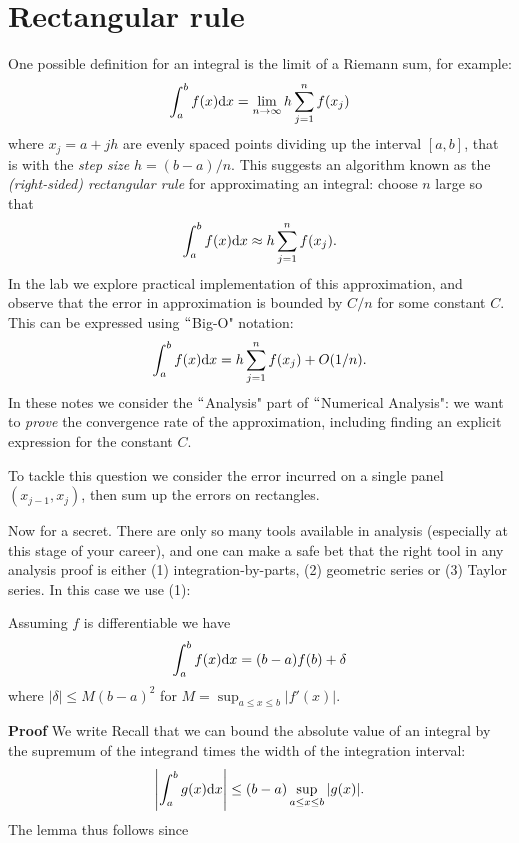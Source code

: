 
\section{Rectangular rule}
One possible definition for an integral is the limit of a Riemann sum, for example:
\[
  \ensuremath{\int}_a^b f(x) {\rm d}x = \lim_{n \ensuremath{\rightarrow} \ensuremath{\infty}} h \ensuremath{\sum}_{j=1}^n f(x_j)
\]
where $x_j = a+jh$ are evenly spaced points dividing up the interval $[a,b]$, that is  with the \emph{step size} $h = (b-a)/n$. This suggests an algorithm known as the \emph{(right-sided) rectangular rule} for approximating an integral: choose $n$ large so that
\[
  \ensuremath{\int}_a^b f(x) {\rm d}x \ensuremath{\approx} h \ensuremath{\sum}_{j=1}^n f(x_j).
\]
In the lab we explore practical implementation of this approximation, and observe that the error in approximation is bounded by $C/n$ for some constant $C$. This can be expressed using \ensuremath{\ldq}Big-O" notation:
\[
\ensuremath{\int}_a^b f(x) {\rm d}x = h \ensuremath{\sum}_{j=1}^n f(x_j) + O(1/n).
\]
In these notes we consider the \ensuremath{\ldq}Analysis" part of \ensuremath{\ldq}Numerical Analysis": we want to \emph{prove} the convergence rate of the approximation, including finding an explicit expression for the constant $C$.

To tackle this question we consider the error incurred on a single panel $(x_{j-1},x_j)$, then sum up the errors on rectangles.

Now for a secret. There are only so many tools available in analysis (especially at this stage of your career), and one can make a safe bet that the right tool in any analysis proof is either (1) integration-by-parts, (2) geometric series or (3) Taylor series. In this case we use (1):

\begin{lemma} Assuming $f$ is differentiable we have
\[
\ensuremath{\int}_a^b f(x) {\rm d}x = (b-a) f(b) + \ensuremath{\delta}
\]
where $|\ensuremath{\delta}| \ensuremath{\leq} M (b-a)^2$ for $M = \sup_{a \ensuremath{\leq} x \ensuremath{\leq} b}|f'(x)|$.

\end{lemma}
\textbf{Proof} We write
Recall that we can bound the absolute value of an integral by the supremum of the integrand times the width of the integration interval:
\[
\left|{\int_a^b g(x) {\rm d} x}\right| \leq (b-a) \sup_{a \leq x \leq b}|g(x)|.
\]
The lemma thus follows since


